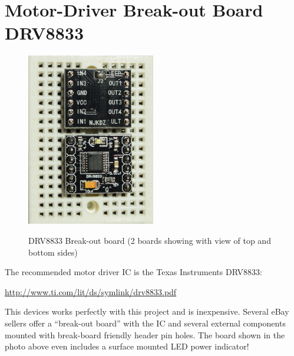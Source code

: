 %
%
%

\chapter{Motor-Driver Break-out Board DRV8833}

\begin{figure}[h]
	\centering
    \includegraphics[width=0.5\textwidth]{photos/drv8833_breakout.jpg}
	\centering\bfseries
	\caption{DRV8833 Break-out board (2 boards showing with view of top and bottom sides)}
\end{figure}


The recommended motor driver IC is the Texas Instruments DRV8833:

\url{http://www.ti.com/lit/ds/symlink/drv8833.pdf}

This devices works perfectly with this project and is inexpensive.
Several eBay sellers offer a ``break-out board'' with the IC and several external components mounted with break-board friendly header pin holes.  The board shown in the photo above even includes a surface mounted LED power indicator!

